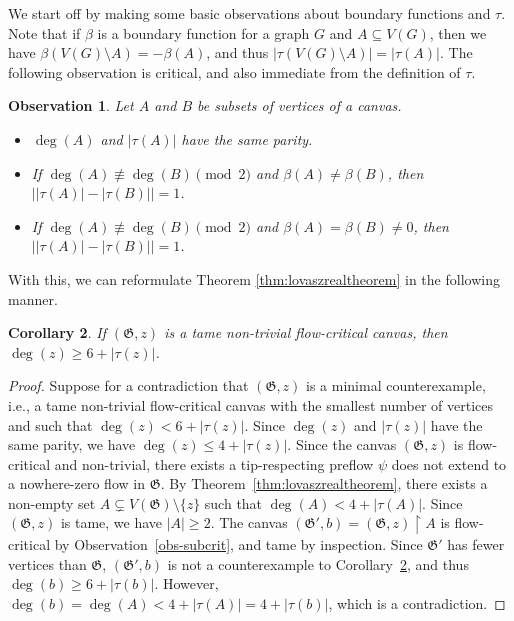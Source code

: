 \documentclass{article}
\newcommand\g{\mathfrak{G}}
\newtheorem{theorem}{Theorem}[section]
\newtheorem{observation}[theorem]{Observation}
\newtheorem{corollary}[theorem]{Corollary}
\begin{document}
We start off by making some basic observations about boundary functions and $\tau$.
Note that if $\beta$ is a boundary function for a graph $G$ and $A \subseteq V(G)$, then we have $\beta(V(G)\setminus A)=-\beta(A)$, and thus $|\tau(V(G)\setminus A)|=|\tau(A)|$. The following observation is critical, and also immediate from the definition of $\tau$.

\begin{observation}\label{obs-tauprop}
Let $A$ and $B$ be subsets of vertices of a canvas.
\begin{itemize}
\item[(a)] $\deg(A)$ and $|\tau(A)|$ have the same parity.
\item[(b)] If $\deg(A) \not\equiv \deg(B) \pmod 2$ and $\beta(A)\neq \beta(B)$, then $\bigl||\tau(A)|-|\tau(B)|\bigr|=1$.
\item[(c)] If $\deg(A) \not \equiv \deg(B) \pmod 2$ and $\beta(A)=\beta(B)\neq 0$, then $\bigl||\tau(A)|-|\tau(B)|\bigr|=1$.
\end{itemize}
\end{observation}

\begin{comment}
Lovász et al.~\cite{ltwz} proved the following key result, which forms the starting point of our paper.
\begin{theorem}\label{thm-mainlov}
Let $(\g,z)$ be a canvas with $\deg(z)\le 4+|\tau(z)|$.  If $\deg(A)\ge 4+|\tau(A)|$ for every non-empty $A\subsetneq V(\g)\setminus\{z\}$,
then every tip preflow extends to a nowhere-zero flow in $\g$.
\end{theorem}
A canvas $(\g,z)$ is \emph{tame} if $\deg(v)\ge 4+|\tau(v)|$ for every $v\in V(\g)\setminus\{z\}$.  In the language of flow-criticality,
\end{comment}

With this, we can reformulate Theorem \ref{thm:lovaszrealtheorem} in the following manner.

\begin{corollary}\label{cor-mainlov}
If $(\g,z)$ is a tame non-trivial flow-critical canvas, then $\deg(z) \ge 6+|\tau(z)|$.
\end{corollary}
\begin{proof}
Suppose for a contradiction that $(\g,z)$ is a minimal counterexample, i.e., a tame non-trivial flow-critical canvas with the smallest number of vertices and such that $\deg(z) <6+|\tau(z)|$. Since $\deg(z)$ and $|\tau(z)|$ have the same parity, we have $\deg(z)\le 4+|\tau(z)|$.
Since the canvas $(\g,z)$ is flow-critical and non-trivial, there exists a tip-respecting preflow $\psi$ does not extend to a nowhere-zero flow in $\g$.
By Theorem~\ref{thm:lovaszrealtheorem}, there exists a non-empty set $A\subsetneq V(\g)\setminus\{z\}$ such that $\deg(A) < 4 + |\tau(A)|$.
Since $(\g,z)$ is tame, we have $|A|\ge 2$.  The canvas $(\g',b)=(\g,z)\restriction A$ is flow-critical by Observation~\ref{obs-subcrit}, and tame by inspection.
Since $\g'$ has fewer vertices than $\g$, $(\g',b)$ is not a counterexample to Corollary~\ref{cor-mainlov}, and thus $\deg(b) \ge 6+|\tau(b)|$.  However, $\deg(b)=\deg(A)< 4 + |\tau(A)|=4+|\tau(b)|$, which is a contradiction.
\end{proof}
\end{document}
